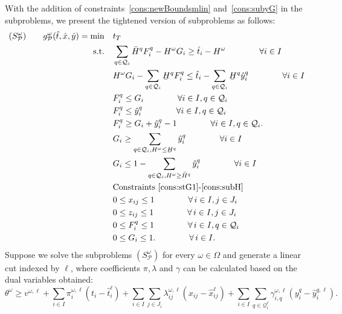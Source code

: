 \documentclass[11pt]{article}
\renewcommand{\underbar}{\underaccent{\bar}}
\begin{document}
	With the addition of constraints~\eqref{cons:newBoundsmlin} and~\eqref{cons:subyG} in the subproblems, we present the tightened version of subproblems as follows: 
	\begin{subequations}
		\label{prob:subTightened}
		\begin{align}
		(S_{\mathcal{P}}^\omega) \qquad g^\omega_{\mathcal{P}}(\hat{t},\hat{x},\hat{y}) = \min \quad & t_T \\
		\text{s.t.} \quad & \sum_{q \in \mathcal{Q}_i} \bar{H}^q F_i^q - H^\omega G_i \geq \hat{t}_i - H^\omega \qquad \qquad \forall i \in I \label{cons:sFG1t}\\
		& H^\omega G_i - \sum_{q \in \mathcal{Q}_i} \underbar{H}^q F_i^q \leq \hat{t}_i - \sum_{q \in \mathcal{Q}_i} \underbar{H}^q \hat{y}_i^q \qquad \qquad \forall i \in I \label{cons:sFG2t}\\
		& F_i^q \leq G_i \qquad \qquad \forall i \in I, q \in \mathcal{Q}_i \label{cons:sFGlin1t}\\
		& F_i^q \leq \hat{y}_i^q \qquad \qquad \forall i \in I, q \in \mathcal{Q}_i \label{cons:sFGlin2t}\\
		& F_i^q \geq G_i + \hat{y}_i^q - 1 \qquad \qquad \forall i \in I, q \in \mathcal{Q}_i. \label{cons:sFGlin3t}\\
		& G_i \geq \sum_{q \in \mathcal{Q}_i, H^\omega \leq \underbar{H}^q} \hat{y}_i^q \qquad \qquad \forall i \in I \label{cons:syG1t}\\
		& G_i \leq 1 - \sum_{q \in \mathcal{Q}_i, H^\omega \geq \bar{H}^q} \hat{y}_i^q \qquad \qquad \forall i \in I \label{cons:syG2t}\\
		& \text{Constraints~\eqref{cons:stG1}-\eqref{cons:subH}}\\
		& 0 \leq x_{ij} \leq 1 \qquad \qquad \forall \,i \in I, j \in J_i\\
		& 0 \leq z_{ij} \leq 1 \qquad \qquad \forall \,i \in I, j \in J_i\\
		& 0 \leq F_i^q \leq 1 \qquad \qquad \forall \,i \in I, q \in \mathcal{Q}_i\\
		& 0 \leq G_i \leq 1. \qquad \qquad \forall \,i \in I. \label{cons:G01t}
		\end{align}
	\end{subequations}
	Suppose we solve the subproblems \((S_{\mathcal{P}}^\omega)\) for every \(\omega \in \Omega\) and generate a linear cut indexed by \(\ell\), where coefficients \(\pi,\lambda\) and \(\gamma\) can be calculated based on the dual variables obtained:
	\begin{equation} \label{cons:cut}
		\theta^\omega \geq v^{\omega,\ell} + \sum_{i \in I} \pi_i^{\omega,\ell} (t_i - \hat{t}_i^{\ell}) + \sum_{i \in I} \sum_{j \in J_i} \lambda_{ij}^{\omega,\ell} (x_{ij} - \hat{x}_{ij}^{\ell}) + \sum_{i \in I} \sum_{q \in \mathcal{Q}^{\ell}_i} \gamma_{i,q}^{\omega,\ell} \left( y_i^{q} - \hat{y}_i^{q,\ell} \right).
	\end{equation}
\end{document}
